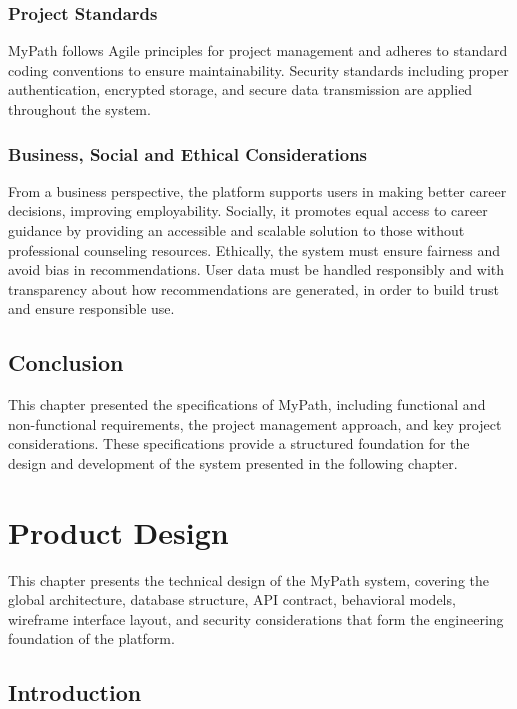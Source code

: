 \documentclass[12pt,a4paper]{article}
\begin{document}
\subsubsection{Project Standards}

MyPath follows Agile principles for project management and adheres to standard coding conventions to ensure maintainability. Security standards including proper authentication, encrypted storage, and secure data transmission are applied throughout the system.

\subsubsection{Business, Social and Ethical Considerations}

From a business perspective, the platform supports users in making better career decisions, improving employability. Socially, it promotes equal access to career guidance by providing an accessible and scalable solution to those without professional counseling resources. Ethically, the system must ensure fairness and avoid bias in recommendations. User data must be handled responsibly and with transparency about how recommendations are generated, in order to build trust and ensure responsible use.

\subsection{Conclusion}

This chapter presented the specifications of MyPath, including functional and non-functional requirements, the project management approach, and key project considerations. These specifications provide a structured foundation for the design and development of the system presented in the following chapter.

\clearpage

\section{Product Design}

This chapter presents the technical design of the MyPath system, covering the global architecture, database structure, API contract, behavioral models, wireframe interface layout, and security considerations that form the engineering foundation of the platform.

\subsection{Introduction}
\end{document}
